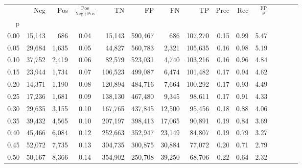 \begin{tabular}{rrrcrrrrrrrrrrr}
\toprule
{} &     Neg &     Pos & $\frac{\text{Pos}}{\text{Neg}+\text{Pos}}$ &       TN &       FP &       FN &       TP &  Prec &   Rec & $\frac{\text{FP}}{\text{P}}$ \\
p    &         &         &                                            &          &          &          &          &       &       &                              \\
\midrule
0.00 &  15,143 &     686 &                                       0.04 &   15,143 &  590,467 &      686 &  107,270 &  0.15 &  0.99 &                         5.47 \\
0.05 &  29,684 &   1,635 &                                       0.05 &   44,827 &  560,783 &    2,321 &  105,635 &  0.16 &  0.98 &                         5.19 \\
0.10 &  37,752 &   2,419 &                                       0.06 &   82,579 &  523,031 &    4,740 &  103,216 &  0.16 &  0.96 &                         4.84 \\
0.15 &  23,944 &   1,734 &                                       0.07 &  106,523 &  499,087 &    6,474 &  101,482 &  0.17 &  0.94 &                         4.62 \\
0.20 &  14,371 &   1,190 &                                       0.08 &  120,894 &  484,716 &    7,664 &  100,292 &  0.17 &  0.93 &                         4.49 \\
0.25 &  17,236 &   1,681 &                                       0.09 &  138,130 &  467,480 &    9,345 &   98,611 &  0.17 &  0.91 &                         4.33 \\
0.30 &  29,635 &   3,155 &                                       0.10 &  167,765 &  437,845 &   12,500 &   95,456 &  0.18 &  0.88 &                         4.06 \\
0.35 &  39,432 &   4,565 &                                       0.10 &  207,197 &  398,413 &   17,065 &   90,891 &  0.19 &  0.84 &                         3.69 \\
0.40 &  45,466 &   6,084 &                                       0.12 &  252,663 &  352,947 &   23,149 &   84,807 &  0.19 &  0.79 &                         3.27 \\
0.45 &  52,072 &   7,735 &                                       0.13 &  304,735 &  300,875 &   30,884 &   77,072 &  0.20 &  0.71 &                         2.79 \\
0.50 &  50,167 &   8,366 &                                       0.14 &  354,902 &  250,708 &   39,250 &   68,706 &  0.22 &  0.64 &                         2.32 \\

\end{tabular}
